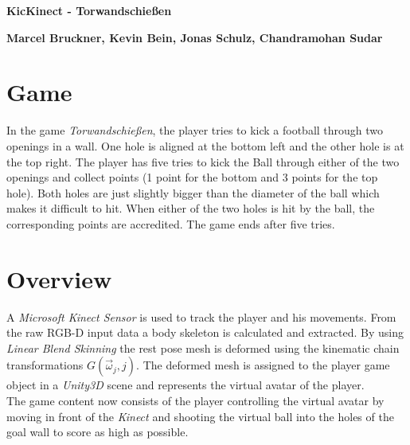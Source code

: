 \documentclass[a4paper,pagesize 10pt]{scrartcl}
\def\linearBlendSkinning{\textit{\linearBlendSkinningn}}
\def\linearBlendSkinningn{Linear Blend Skinning}
\def\kinect{\textit{Kinect}}
\newcommand{\image}[3]{
	\begin{center}
		\texttt{[image: \#1]}
		\
		\begin{flushleft}
			\begin{center}
				\textit{#2}
			\end{center}
		\end{flushleft}
	\end{center}
}
\begin{document}
\begin{center}{\Huge\textbf{KicKinect - Torwandschießen}}\end{center}
\begin{center}{\Large\textbf{Marcel Bruckner, Kevin Bein, Jonas Schulz, Chandramohan Sudar}}\end{center}

\section{Game}

In the game \textit{Torwandschießen}, the player tries to kick a football through two openings in a wall.
One hole is aligned at the bottom left and the other hole is at the top right.
The player has five tries to kick the Ball through either of the two openings and collect points (1 point for the bottom and 3 points for the top hole).
Both holes are just slightly bigger than the diameter of the ball which makes it difficult to hit.
When either of the two holes is hit by the ball, the corresponding points are accredited.
The game ends after five tries.


\section{Overview}
A \textit{Microsoft Kinect Sensor} is used to track the player and his movements.
From the raw RGB-D input data a body skeleton is calculated and extracted.
By using \linearBlendSkinning{} the rest pose mesh is deformed using the kinematic chain transformations $G(\vec{\omega}_j, j)$.
The deformed mesh is assigned to the player game object in a \textit{Unity3D} scene and represents the virtual avatar of the player. \\
The game content now consists of the player controlling the virtual avatar by moving in front of the \kinect{} and shooting the virtual ball into the holes of the goal wall to score as high as possible.\\
\end{document}

